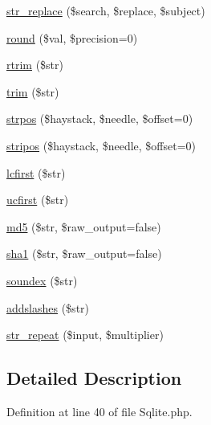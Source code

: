 \begin{DoxyCompactItemize}
\hyperlink{class_p_h_p_linq___adapter___pdo___sqlite_acf873c5fe629bc33732a0a2bc304f0f8}{str\-\_\-replace} (\$search, \$replace, \$subject)
\item 
\hyperlink{class_p_h_p_linq___adapter___pdo___sqlite_aa9d8fa8127391960c54ee0c5a31e18a3}{round} (\$val, \$precision=0)
\item 
\hyperlink{class_p_h_p_linq___adapter___pdo___sqlite_afa81b944f8aed770a266a9884e3e5049}{rtrim} (\$str)
\item 
\hyperlink{class_p_h_p_linq___adapter___pdo___sqlite_a432e7b973a6e6bfa55cced21e75ee29e}{trim} (\$str)
\item 
\hyperlink{class_p_h_p_linq___adapter___pdo___sqlite_a75b50139ee3829fbfd47af6805284786}{strpos} (\$haystack, \$needle, \$offset=0)
\item 
\hyperlink{class_p_h_p_linq___adapter___pdo___sqlite_aa0297b92e96759a576d3aa8caa22b10d}{stripos} (\$haystack, \$needle, \$offset=0)
\item 
\hyperlink{class_p_h_p_linq___adapter___pdo___sqlite_a30bdc1fd395302cfaeabd165adde41c9}{lcfirst} (\$str)
\item 
\hyperlink{class_p_h_p_linq___adapter___pdo___sqlite_a7d8809b3fca65a75b2bd2ebbea5b3695}{ucfirst} (\$str)
\item 
\hyperlink{class_p_h_p_linq___adapter___pdo___sqlite_ad89ffd1039629dc781704c405abc87a7}{md5} (\$str, \$raw\-\_\-output=false)
\item 
\hyperlink{class_p_h_p_linq___adapter___pdo___sqlite_aeb44f0e1038759e5c086db848661f845}{sha1} (\$str, \$raw\-\_\-output=false)
\item 
\hyperlink{class_p_h_p_linq___adapter___pdo___sqlite_a5d9e5163f9c4dfcf3b36a635c8ba5638}{soundex} (\$str)
\item 
\hyperlink{class_p_h_p_linq___adapter___pdo___sqlite_aec7fed6f81c650fb3106e2f0eed11e03}{addslashes} (\$str)
\item 
\hyperlink{class_p_h_p_linq___adapter___pdo___sqlite_a046ec25a1370781be01e1590d84aecf7}{str\-\_\-repeat} (\$input, \$multiplier)
\end{DoxyCompactItemize}


\subsection{\-Detailed \-Description}


\-Definition at line 40 of file \-Sqlite.\-php.



